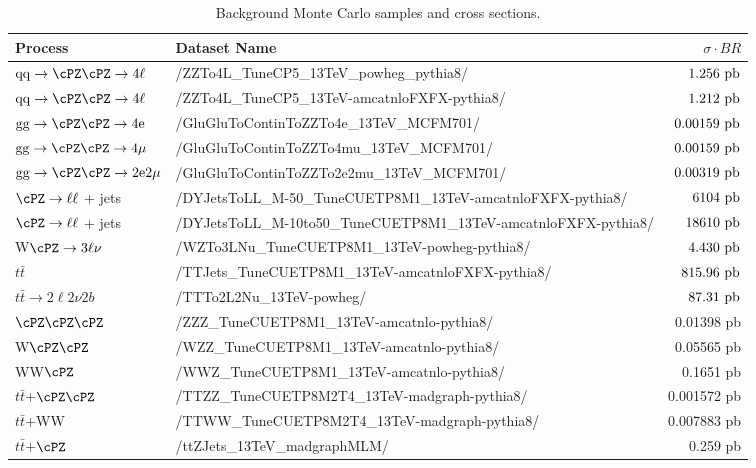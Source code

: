 \begin{table}
\begin{footnotesize}
    \centering
    \begin{tabular}{|l|l|r|}
   \hline
 Process & Dataset Name & $\sigma\cdot BR$ \\ \hline
 $\rm{qq} \to \cPZ\cPZ \to 4\ell$ & /ZZTo4L\_TuneCP5\_13TeV\_powheg\_pythia8/ & $1.256~\rm{pb}$ \\
 $\rm{qq} \to \cPZ\cPZ \to 4\ell$ & /ZZTo4L\_TuneCP5\_13TeV-amcatnloFXFX-pythia8/ & $1.212~\rm{pb}$ \\
 $\rm{gg} \rightarrow \cPZ\cPZ \to 4e$ & /GluGluToContinToZZTo4e\_13TeV\_MCFM701/ & $0.00159~\rm{ pb}$ \\
 $\rm{gg} \rightarrow \cPZ\cPZ \to 4\mu$ & /GluGluToContinToZZTo4mu\_13TeV\_MCFM701/ & $0.00159~\rm{ pb}$ \\
 $\rm{gg} \rightarrow \cPZ\cPZ \to 2e2\mu$ & /GluGluToContinToZZTo2e2mu\_13TeV\_MCFM701/ & $0.00319~\rm{ pb}$ \\
 $\cPZ \to \ell\ell$ + jets & /DYJetsToLL\_M-50\_TuneCUETP8M1\_13TeV-amcatnloFXFX-pythia8/ & $6104~\rm{ pb}$ \\
 $\cPZ \to \ell\ell$ + jets  & /DYJetsToLL\_M-10to50\_TuneCUETP8M1\_13TeV-amcatnloFXFX-pythia8/ & $18610~\rm{ pb}$ \\ \hline
 W$\cPZ \to 3\ell\nu$ & /WZTo3LNu\_TuneCUETP8M1\_13TeV-powheg-pythia8/ & $4.430~\rm{ pb}$ \\ \hline
 $t\bar{t}$ & /TTJets\_TuneCUETP8M1\_13TeV-amcatnloFXFX-pythia8/ & $815.96~\rm{ pb}$ \\ 
 $t\bar{t} \to 2\ell2\nu 2b$ & /TTTo2L2Nu\_13TeV-powheg/ &  $87.31~\rm{pb}$ \\ 
\hline
$\cPZ\cPZ\cPZ$ & /ZZZ\_TuneCUETP8M1\_13TeV-amcatnlo-pythia8/ & 0.01398 pb \\
W$\cPZ\cPZ$ &  /WZZ\_TuneCUETP8M1\_13TeV-amcatnlo-pythia8/ & 0.05565 pb \\
WW$\cPZ$ & /WWZ\_TuneCUETP8M1\_13TeV-amcatnlo-pythia8/ & 0.1651 pb \\ 
\hline
$t\bar{t}$+$\cPZ\cPZ$ & /TTZZ\_TuneCUETP8M2T4\_13TeV-madgraph-pythia8/ & 0.001572 pb \\
$t\bar{t}$+WW & /TTWW\_TuneCUETP8M2T4_13TeV-madgraph-pythia8/ & 0.007883 pb \\
$t\bar{t}$+$\cPZ$ & /ttZJets\_13TeV\_madgraphMLM/ & 0.259 pb \\
\hline
 \end{tabular}
 \caption{Background Monte Carlo samples and cross sections.}
  \label{tab:MCsamples}
\end{footnotesize}
\end{table}


